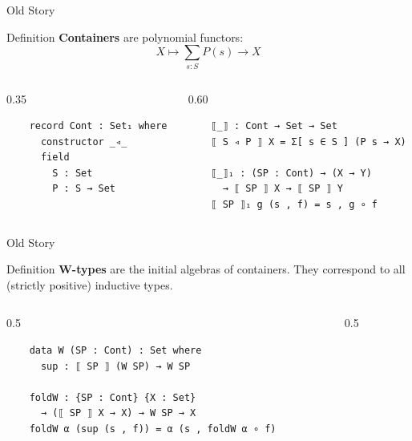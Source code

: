 \documentclass{beamer}
\begin{document}
\begin{frame}[fragile]{Old Story}

\begin{block}{Definition}
\textbf{Containers} are polynomial functors:
\[ X \mapsto \sum_{s : S} P(s) \to X \]
\end{block}

\begin{exampleblock}{}
  \begin{columns}
    \begin{column}{0.35\textwidth}
    \begin{verbatim}
    record Cont : Set₁ where
      constructor _◃_
      field
        S : Set
        P : S → Set
    \end{verbatim}
    \end{column}

    \begin{column}{0.60\textwidth}
    \begin{verbatim}
    ⟦_⟧ : Cont → Set → Set
    ⟦ S ◃ P ⟧ X = Σ[ s ∈ S ] (P s → X)

    ⟦_⟧₁ : (SP : Cont) → (X → Y) 
      → ⟦ SP ⟧ X → ⟦ SP ⟧ Y
    ⟦ SP ⟧₁ g (s , f) = s , g ∘ f
    \end{verbatim}
    \end{column}
  \end{columns}
\end{exampleblock}
\end{frame}

\begin{frame}[fragile]{Old Story}

\begin{block}{Definition}
\textbf{W-types} are the initial algebras of containers.
They correspond to all (strictly positive) inductive types.
\end{block}

\begin{exampleblock}{}
  \begin{columns}
    \begin{column}{0.5\textwidth}
    \begin{verbatim}  
    data W (SP : Cont) : Set where
      sup : ⟦ SP ⟧ (W SP) → W SP

    foldW : {SP : Cont} {X : Set}
      → (⟦ SP ⟧ X → X) → W SP → X
    foldW α (sup (s , f)) = α (s , foldW α ∘ f)
    \end{verbatim}
    \end{column}

    \begin{column}{0.5\textwidth}
    \end{column}
  \end{columns}
\end{exampleblock}
\end{frame}
\end{document}
